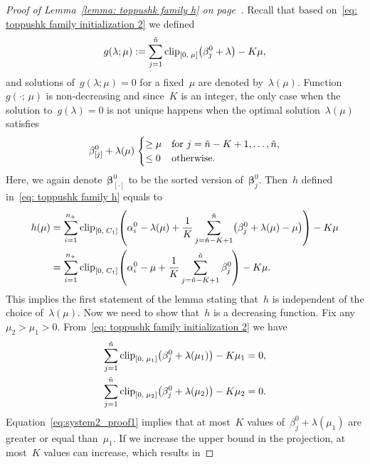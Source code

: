 \topinith*
\begin{proof}[Proof of Lemma~\ref{lemma: toppushk family h} on page~\pageref{lemma: toppushk family h}]
  Recall that based on~\eqref{eq: toppushk family initialization 2} we defined
  \begin{equation*}
    g(\lambda; \mu) := \sum_{j=1}^{\ntil} \clip{0}{\mu}{\beta_j^0 + \lambda} - K \mu,
  \end{equation*}
  and solutions of~$g(\lambda; \mu) = 0$ for a fixed~$\mu$ are denoted by~$\lambda(\mu)$. Function~$g(\cdot; \, \mu)$ is non-decreasing and since~$K$ is an integer, the only case when the solution to~$g(\lambda) = 0$ is not unique happens when the optimal solution~$\lambda(\mu)$ satisfies
  \begin{equation*}
    \beta_{[j]}^0 + \lambda(\mu) \;
    \begin{cases}
      \ge \mu & \text{for } j = \ntil - K + 1, \dots , \ntil, \\
      \le 0 & \text{otherwise.}
    \end{cases}
  \end{equation*}
  Here, we again denote~$\bm{\beta}_{[\cdot]}^0$ to be the sorted version of~$\bm{\beta}_j^0$. Then~$h$ defined in~\eqref{eq: toppushk family h} equals to
  \begin{align*}
    h(\mu)
      & = \sum_{i=1}^{\npos} \clip{0}{C_1}{\alpha_i^0 - \lambda(\mu) + \frac{1}{K} \sum_{j=\ntil - K + 1}^{\ntil} \Brac{\beta_j^0+\lambda(\mu) - \mu}} - K \mu \\
      & = \sum_{i=1}^{\npos} \clip{0}{C_1}{\alpha_i^0 - \mu + \frac{1}{K} \sum_{j=\ntil - K + 1}^{\ntil} \beta_j^0} - K \mu.
  \end{align*}
  This implies the first statement of the lemma stating that~$h$ is independent of the choice of~$\lambda(\mu)$. Now we need to show that~$h$ is a decreasing function. Fix any~$\mu_2 > \mu_1 > 0$. From~\eqref{eq: toppushk family initialization 2} we have
  \begin{align}
   \sum_{j=1}^{\ntil} \clip{0}{\mu_1}{\beta_j^0 + \lambda(\mu_1)} - K \mu_1 & = 0,
    \label{eq:system2_proof1} \\
  \sum_{j=1}^{\ntil} \clip{0}{\mu_2}{\beta_j^0 + \lambda(\mu_2)} - K \mu_2 & = 0.
    \label{eq:system2_proof2}
  \end{align}
  Equation~\eqref{eq:system2_proof1} implies that at most~$K$ values of~$\beta_j^0 + \lambda(\mu_1)$ are greater or equal than~$\mu_1$. If we increase the upper bound in the projection, at most~$K$ values can increase, which results in

\end{proof}
